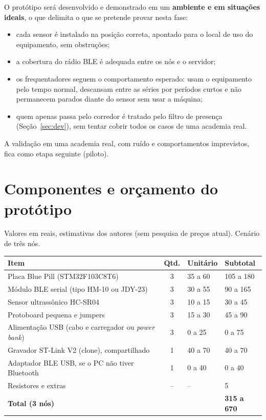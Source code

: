 \documentclass[11pt,a4paper]{article}
\begin{document}
O protótipo será desenvolvido e demonstrado em um \textbf{ambiente e em
situações ideais}, o que delimita o que se pretende provar nesta fase:
\begin{itemize}
  \item cada sensor é instalado na posição correta, apontado para o local de uso
        do equipamento, sem obstruções;
  \item a cobertura do rádio BLE é adequada entre os nós e o servidor;
  \item os frequentadores seguem o comportamento esperado: usam o equipamento
        pelo tempo normal, descansam entre as séries por períodos curtos e não
        permanecem parados diante do sensor sem usar a máquina;
  \item quem apenas passa pelo corredor é tratado pelo filtro de presença
        (Seção~\ref{sec:dev}), sem tentar cobrir todos os casos de uma academia
        real.
\end{itemize}
A validação em uma academia real, com ruído e comportamentos imprevistos, fica
como etapa seguinte (piloto).

\section{Componentes e orçamento do protótipo}

Valores em reais, estimativas dos autores (sem pesquisa de preços atual).
Cenário de três nós.

\begin{longtable}{|L{6.4cm}|c|L{2.6cm}|L{2.4cm}|}
\hline
\textbf{Item} & \textbf{Qtd.} & \textbf{Unitário} & \textbf{Subtotal} \\ \hline
Placa Blue Pill (STM32F103C8T6) & 3 & 35 a 60 & 105 a 180 \\ \hline
Módulo BLE serial (tipo HM-10 ou JDY-23) & 3 & 30 a 55 & 90 a 165 \\ \hline
Sensor ultrassônico HC-SR04 & 3 & 10 a 15 & 30 a 45 \\ \hline
Protoboard pequena e jumpers & 3 & 15 a 30 & 45 a 90 \\ \hline
Alimentação USB (cabo e carregador ou \emph{power bank}) & 3 & 0 a 25 & 0 a 75 \\ \hline
Gravador ST-Link V2 (clone), compartilhado & 1 & 40 a 70 & 40 a 70 \\ \hline
Adaptador BLE USB, se o PC não tiver Bluetooth & 1 & 0 a 40 & 0 a 40 \\ \hline
Resistores e extras & -- & -- & 5 \\ \hline
\textbf{Total (3 nós)} & & & \textbf{315 a 670} \\ \hline
\end{longtable}
\end{document}
